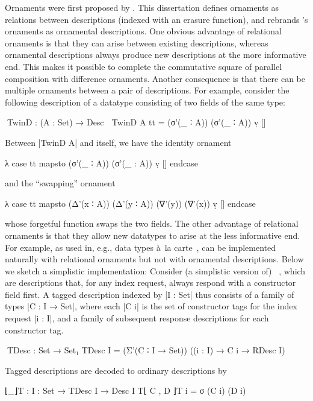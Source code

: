 Ornaments were first proposed by \citet{McBride-ornaments}.
This dissertation defines ornaments as relations between descriptions (indexed with an erasure function), and rebrands \citeauthor{McBride-ornaments}'s ornaments as ornamental descriptions.
One obvious advantage of relational ornaments is that they can arise between existing descriptions, whereas ornamental descriptions always produce new descriptions at the more informative end.
This makes it possible to complete the commutative square of parallel composition with difference ornaments.
Another consequence is that there can be multiple ornaments between a pair of descriptions.
For example, consider the following description of a datatype consisting of two fields of the same type:
\begin{code}
^^^TwinD : (A : Set) → Desc ⊤
TwinD A tt = (σ'(_ ∶ A)) (σ'(_ ∶ A)) ṿ []
\end{code}
Between |TwinD A| and itself, we have the identity ornament
\begin{code}
λ case tt mapsto (σ'(_ ∶ A)) (σ'(_ : A)) ṿ [] endcase
\end{code}
and the ``swapping'' ornament
\begin{code}
λ case tt mapsto (Δ'(x ∶ A)) (Δ'(y ∶ A)) (∇'(y)) (∇'(x)) ṿ [] endcase
\end{code}
whose forgetful function swaps the two fields.
The other advantage of relational ornaments is that they allow new datatypes to arise at the less informative end.
For example,  as used in, e.g., data types à~la carte~\citep{Swierstra-data-types-a-la-carte}, can be implemented naturally with relational ornaments but not with ornamental descriptions.
Below we sketch a simplistic implementation: Consider (a simplistic version of) ~\citep{Chapman-levitation}, which are descriptions that, for any index request, always respond with a constructor field first.
A tagged description indexed by |I : Set| thus consists of a family of types |C : I → Set|, where each |C i| is the set of constructor tags for the index request |i : I|, and a family of subsequent response descriptions for each constructor tag.
\begin{code}
^^^TDesc : Set → Set₁
TDesc I = (Σ'(C ∶ I → Set)) ((i : I) → C i → RDesc I)
\end{code}
Tagged descriptions are decoded to ordinary descriptions by
\begin{code}
⌊_⌋T : {I : Set} → TDesc I → Desc I
T⌊ C , D ⌋T i = σ (C i) (D i)
\end{code}
